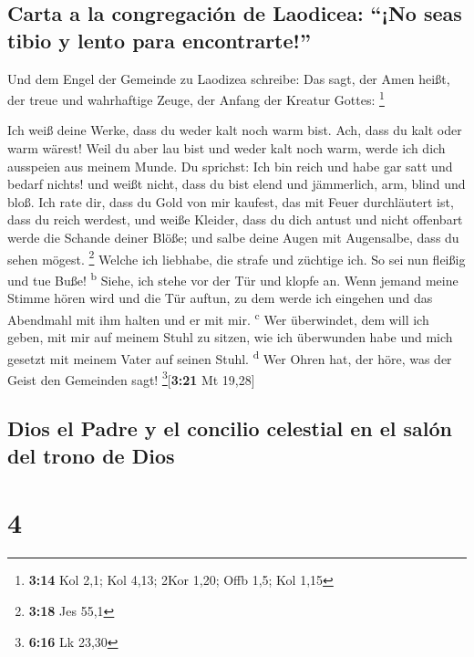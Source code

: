 \hypertarget{carta-a-la-congregaciuxf3n-de-laodicea-no-seas-tibio-y-lento-para-encontrarte}{%
\subsection{Carta a la congregación de Laodicea: ``¡No seas tibio y
lento para
encontrarte!''}\label{carta-a-la-congregaciuxf3n-de-laodicea-no-seas-tibio-y-lento-para-encontrarte}}

 Und dem Engel der Gemeinde zu Laodizea schreibe: Das
sagt, der Amen heißt, der treue und wahrhaftige Zeuge, der Anfang der
Kreatur Gottes: \footnote{\textbf{3:14} Kol 2,1; Kol 4,13; 2Kor 1,20;
  Offb 1,5; Kol 1,15}

 Ich weiß deine Werke, dass du weder kalt noch warm bist.
Ach, dass du kalt oder warm wärest!  Weil du aber lau
bist und weder kalt noch warm, werde ich dich ausspeien aus meinem
Munde.  Du sprichst: Ich bin reich und habe gar satt und
bedarf nichts! und weißt nicht, dass du bist elend und jämmerlich, arm,
blind und bloß.  Ich rate dir, dass du Gold von mir
kaufest, das mit Feuer durchläutert ist, dass du reich werdest, und
weiße Kleider, dass du dich antust und nicht offenbart werde die Schande
deiner Blöße; und salbe deine Augen mit Augensalbe, dass du sehen
mögest. \footnote{\textbf{3:18} Jes 55,1}  Welche ich
liebhabe, die strafe und züchtige ich. So sei nun fleißig und tue Buße!
\textsuperscript{b}  Siehe, ich stehe vor der Tür und
klopfe an. Wenn jemand meine Stimme hören wird und die Tür auftun, zu
dem werde ich eingehen und das Abendmahl mit ihm halten und er mit mir.
\textsuperscript{c}  Wer überwindet, dem will ich geben,
mit mir auf meinem Stuhl zu sitzen, wie ich überwunden habe und mich
gesetzt mit meinem Vater auf seinen Stuhl. \textsuperscript{d}
 Wer Ohren hat, der höre, was der Geist den Gemeinden
sagt! \footnote{\textbf{6:16} Lk 23,30}{[}\textbf{3:21} Mt 19,28{]}

\hypertarget{dios-el-padre-y-el-concilio-celestial-en-el-saluxf3n-del-trono-de-dios}{%
\subsection{Dios el Padre y el concilio celestial en el salón del trono
de
Dios}\label{dios-el-padre-y-el-concilio-celestial-en-el-saluxf3n-del-trono-de-dios}}

\hypertarget{section-3}{%
\section{4}\label{section-3}}

